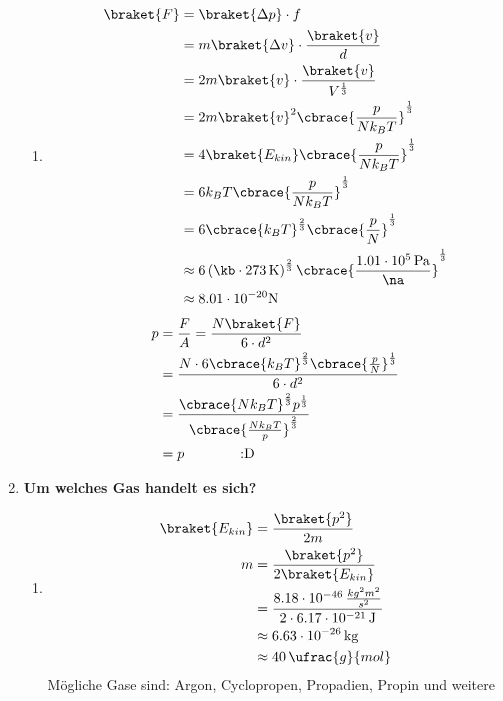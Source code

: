 \documentclass[11pt,letterpaper]{article}
\begin{document}
\begin{enumerate}
\begin{enumerate}
      \item 
        \begin{align*}
          \braket{F} &= \braket{\Delta p} \cdot f\\
          &= m\braket{\Delta v} \cdot \frac{\braket{v}}{d}\\
          &= 2m\braket{v} \cdot \frac{\braket{v}}{V^{\frac{1}{3}}}\\
          &= 2m \braket{v}^2\cbrace{\frac{p}{Nk_BT}}^{\frac{1}{3}}\\
          &= 4\braket{E_{kin}}\cbrace{\frac{p}{Nk_BT}}^{\frac{1}{3}}\\
          &= 6 k_B T \cbrace{\frac{p}{Nk_BT}}^{\frac{1}{3}}\\
          &= 6 \cbrace{k_B T}^{\frac{2}{3}} \cbrace{\frac{p}{N}}^{\frac{1}{3}}\\
          &\approx 6 \left(\kb \cdot 273\,\mathrm{K}\right)^{\frac{2}{3}}\cbrace{\frac{1.01\cdot 10^5\,\mathrm{Pa}}{\na}}^{\frac{1}{3}}\\
          &\approx 8.01 \cdot 10^{-20}\mathrm{N}
        \end{align*}
        \begin{align*}
          {p} &= \frac{F}{A} 
          = \frac{N \braket{F}}{6\cdot d^2}\\
          &= \frac{N \cdot 6 \cbrace{k_B T}^{\frac{2}{3}} \cbrace{\frac{p}{N}}^{\frac{1}{3}}}{6\cdot d^2}\\
          &= \frac{ \cbrace{N k_B T}^{\frac{2}{3}} {p}^{\frac{1}{3}}}{ \cbrace{\frac{Nk_BT}{p}}^{\frac{2}{3}}}\\
          &= p \qquad \qquad \text{:D}\\
        \end{align*}
    \end{enumerate}

\newpage
  \item \textbf{Um welches Gas handelt es sich? }
    \begin{enumerate}
      \item
        \begin{align*}
          \braket{E_{kin}} &= \frac{\braket{p^2}}{2m}\\
          m  &= \frac{\braket{p^2}}{2 \braket{E_{kin}}}\\
          &= \frac{8.18\cdot 10^{-46}\,\frac{kg^2m^2}{s^2}}{2 \cdot 6.17\cdot 10^{-21}\,\mathrm{J}}\\
          &\approx 6.63 \cdot 10^{-26}\,\mathrm{kg} \\
          &\approx 40\,\ufrac{g}{mol}
        \end{align*}
        Mögliche Gase sind: Argon, Cyclopropen, Propadien, Propin und weitere\\


\end{enumerate}
\end{enumerate}
\end{document}
